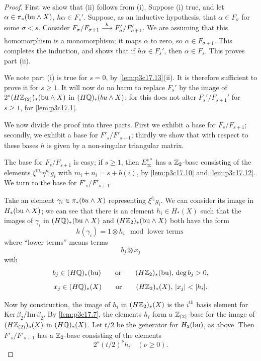\documentclass[../main]{subfiles}
\begin{document}
\begin{proof}
First we show that (ii) follows from (i). Suppose (i) true, and let $\alpha\in\pi_\ast(\mathrm{bu}\wedge X)$, $h\alpha\in F_s'$. Suppose, as an inductive hypothesis, that $\alpha\in F_\sigma$ for some $\sigma<s$. Consider $F_\sigma/F_{\sigma+1}\lar{h}F_\sigma'/F_{\sigma+1}'$. We are assuming that this homomorphism is a monomorphism; it maps $\alpha$ to zero, so $\alpha\in F_{\sigma+1}$. This completes the induction, and shows that if $h\alpha\in F_s'$, then $\alpha\in F_s$. This proves part (ii).

We note part (i) is true for $s = 0$, by \ref{lem:p3c17.13}(ii). It is therefore sufficient to prove it for $s \ge 1$. It will now do no harm to replace $F_s'$ by the image of $2^s(H\mathbb{Z}_{(2)})_\ast(\mathrm{bu} \wedge X)$ in $(H\bbQ)_\ast(\mathrm \te{bu} \wedge X)$; for this does not alter $F_s'/F_{s + 1}'$ for $s \ge 1$, for \ref{lem:p3c17.1}.

We now divide the proof into three parts. First we exhibit a base for $F_s/F_{s + 1}$; secondly, we exhibit a base for $F'_s/F'_{s + 1}$; thirdly we show that with respect to these bases $h$ is given by a non-singular triangular matrix.

The base for $F_s/F_{s + 1}$ is easy; if $s \ge 1$, then $E_\infty^{s\ast}$ has a $\mathbb{Z}_2$-base consisting of the elements $\xi^{m_i} \eta^{n_i} g_i$ with $m_i + n_i = s + b(i)$, by \ref{lem:p3c17.10} and \ref{lem:p3c17.12}. We turn to the base for $F'_s/F'_{s + 1}$. 

Take an element $\gamma_i \in \pi_\ast(\mathrm \te{bu} \wedge X)$ representing $\xi^{b_i} g_i$. We can consider its image in $H_\ast(\mathrm{bu} \wedge X)$; we can see that there is an element $h_i \in H_\ast(X)$ such that the images of $\gamma_i$ in $(H \mathbb{Q})_\ast(\mathrm{bu} \wedge X)$ and $(H\mathbb{Z}_2)_\ast(\mathrm{bu} \wedge X)$ both have the form \[h(\gamma_i) = 1 \otimes h_i \mod \text{ lower terms}\] where ``lower terms'' means terms \[b_j \otimes x_j\] with \[b_j \in (H \mathbb{Q})_\ast(\mathrm{bu}) \qquad \text {or} \qquad (H \mathbb{Z}_2)_\ast(\mathrm{bu}), \, \deg b_j > 0,\] \[x_j \in (H \mathbb{Q})_\ast(X) \qquad \text{or} \qquad (H \mathbb{Z}_2)_\ast(X), \, |x_j| < |h_i|.\]

Now by construction, the image of $h_i$ in $(H\mathbb{Z}_2)_\ast(X)$ is the $i^{\mathrm{th}}$ basis element for $\mathrm{Ker} \, \beta_2/\mathrm{Im} \, \beta_2$. By \ref{lem:p3c17.7}, the elements $h_i$ form a $\mathbb{Z}_{(2)}$-base for the image of $(H \mathbb{Z}_{(2)})_\ast(X)$ in $(H\mathbb{Q})_\ast(X)$. Let $t/2$ be the generator for $H_2(\mathrm{bu})$, as above. Then $F'_s/F'_{s + 1}$ has a $\mathbb{Z}_2$-base consisting of the elements \[2^s(t/2)^\nu h_i \quad (\nu \ge 0).\] 


\end{proof}
\end{document}
